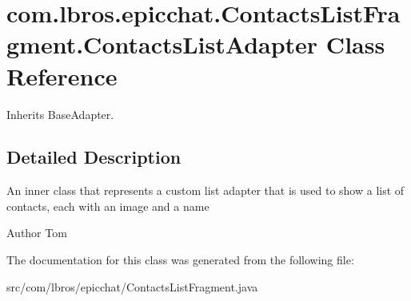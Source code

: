 \hypertarget{classcom_1_1lbros_1_1epicchat_1_1_contacts_list_fragment_1_1_contacts_list_adapter}{\section{com.\-lbros.\-epicchat.\-Contacts\-List\-Fragment.\-Contacts\-List\-Adapter Class Reference}
\label{classcom_1_1lbros_1_1epicchat_1_1_contacts_list_fragment_1_1_contacts_list_adapter}
}


Inherits Base\-Adapter.



\subsection{Detailed Description}
An inner class that represents a custom list adapter that is used to show a list of contacts, each with an image and a name \begin{DoxyAuthor}{Author}
Tom 
\end{DoxyAuthor}


The documentation for this class was generated from the following file\-:\begin{DoxyCompactItemize}
\item 
src/com/lbros/epicchat/Contacts\-List\-Fragment.\-java\end{DoxyCompactItemize}
